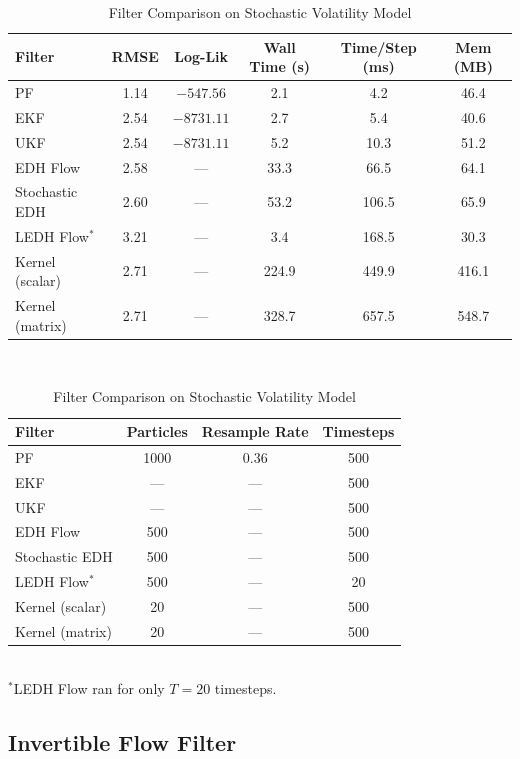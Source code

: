 \documentclass{article}
\begin{document}
\begin{table}[H]
\centering
\caption{Filter Comparison on Stochastic Volatility Model}
\begin{tabular}{lccccc}
\toprule
\textbf{Filter} & \textbf{RMSE} & \textbf{Log-Lik} & \textbf{Wall Time (s)} & \textbf{Time/Step (ms)} & \textbf{Mem (MB)} \\
\midrule
PF              & 1.14  & $-547.56$   & 2.1    & 4.2     & 46.4   \\
EKF             & 2.54  & $-8731.11$  & 2.7    & 5.4     & 40.6   \\
UKF             & 2.54  & $-8731.11$  & 5.2    & 10.3    & 51.2   \\
EDH Flow        & 2.58  & ---         & 33.3   & 66.5    & 64.1   \\
Stochastic EDH  & 2.60  & ---         & 53.2   & 106.5   & 65.9   \\
LEDH Flow$^*$   & 3.21  & ---         & 3.4    & 168.5   & 30.3   \\
Kernel (scalar) & 2.71  & ---         & 224.9  & 449.9   & 416.1  \\
Kernel (matrix) & 2.71  & ---         & 328.7  & 657.5   & 548.7  \\
\bottomrule
\end{tabular}
\\[1em]
\begin{tabular}{lccc}
\toprule
\textbf{Filter} & \textbf{Particles} & \textbf{Resample Rate} & \textbf{Timesteps} \\
\midrule
PF              & 1000 & 0.36 & 500 \\
EKF             & ---  & ---  & 500 \\
UKF             & ---  & ---  & 500 \\
EDH Flow        & 500  & ---  & 500 \\
Stochastic EDH  & 500  & ---  & 500 \\
LEDH Flow$^*$   & 500  & ---  & 20  \\
Kernel (scalar) & 20   & ---  & 500 \\
Kernel (matrix) & 20   & ---  & 500 \\
\bottomrule
\end{tabular}
\\[0.5em]
{\small $^*$LEDH Flow ran for only $T=20$ timesteps.}
\label{tab:sv_comparison}
\end{table}


\subsection{Invertible Flow Filter}
\end{document}
